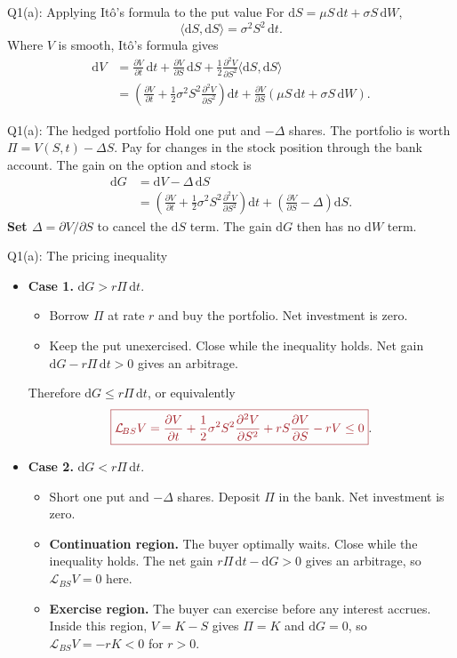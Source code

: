 \documentclass{beamer}
\newcommand{\keymath}[1]{\textcolor{lecturekey}{#1}}
\newcommand{\keybox}[1]{\keymath{\boxed{#1}}}
\newcommand{\keytext}[1]{\textcolor{lecturekey}{\textbf{#1}}}
\newcommand{\BS}{\mathcal L_{\!BS}}
\newcommand{\dd}{\mathrm d}
\begin{document}
\begin{frame}{Q1(a): Applying It\^o's formula to the put value}
\small
For $\dd S=\mu S\,\dd t+\sigma S\,\dd W$,
\[
\langle\dd S,\dd S\rangle=\sigma^2S^2\,\dd t.
\]
Where $V$ is smooth, It\^o's formula gives
\begin{align*}
\dd V
&=\frac{\partial V}{\partial t}\,\dd t
+\frac{\partial V}{\partial S}\,\dd S
+\frac12\frac{\partial^2 V}{\partial S^2}\langle\dd S,\dd S\rangle\\
&=\left(\frac{\partial V}{\partial t}
+\frac12\sigma^2 S^2\frac{\partial^2 V}{\partial S^2}\right)\dd t
+\frac{\partial V}{\partial S}(\mu S\,\dd t+\sigma S\,\dd W).
\end{align*}
\end{frame}

\begin{frame}{Q1(a): The hedged portfolio}
\small
Hold one put and $-\Delta$ shares. The portfolio is worth
$\Pi=V(S,t)-\Delta S$. Pay for changes in the stock position through
the bank account. The gain on the option and stock is
\begin{align*}
\dd G&=\dd V-\Delta\,\dd S\\
&=\left(\frac{\partial V}{\partial t}
+\frac12\sigma^2S^2\frac{\partial^2 V}{\partial S^2}\right)\dd t
+\left(\frac{\partial V}{\partial S}-\Delta\right)\dd S.
\end{align*}
\keytext{Set $\Delta=\partial V/\partial S$} to cancel the $\dd S$ term.
The gain $\dd G$ then has no $\dd W$ term.
\end{frame}

\begin{frame}{Q1(a): The pricing inequality}
\footnotesize
\begin{itemize}
\item \textbf{Case 1.} $\dd G>r\Pi\,\dd t$.
  \begin{itemize}
  \item Borrow $\Pi$ at rate $r$ and buy the portfolio. Net investment is zero.
  \item Keep the put unexercised. Close while the inequality holds.
  Net gain $\dd G-r\Pi\,\dd t>0$ gives an arbitrage.
  \end{itemize}
  Therefore $\dd G\leq r\Pi\,\dd t$, or equivalently
  \[
  \keybox{\BS V=
  \frac{\partial V}{\partial t}
  +\frac12\sigma^2S^2\frac{\partial^2 V}{\partial S^2}
  +rS\frac{\partial V}{\partial S}-rV\leq0}.
  \]
\item \textbf{Case 2.} $\dd G<r\Pi\,\dd t$.
  \begin{itemize}
  \item Short one put and $-\Delta$ shares. Deposit $\Pi$ in the bank.
  Net investment is zero.
  \item \keytext{Continuation region.} The buyer optimally waits. Close
  while the inequality holds. The net gain $r\Pi\,\dd t-\dd G>0$
  gives an arbitrage, so $\BS V=0$ here.
  \item \keytext{Exercise region.} The buyer can exercise before any interest
  accrues. Inside this region, $V=K-S$ gives $\Pi=K$ and $\dd G=0$,
  so $\BS V=-rK<0$ for $r>0$.
  \end{itemize}
\end{itemize}
\end{frame}
\end{document}
